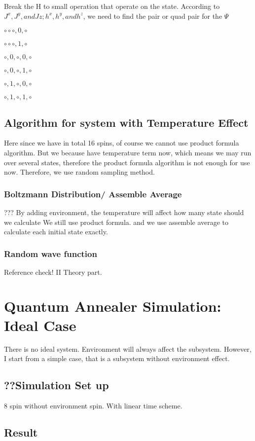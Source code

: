 \documentclass[twoside,a4paper,article]{combine}
\begin{document}
Break the H to small operation that operate on the state. According to $J^x , J^y, and Jz; h^x, h^y, and h^z$, we need to find the pair or quad pair for the $\Psi$

$\circ \circ \circ ,0, \circ$

$\circ \circ \circ ,1, \circ$

$\circ ,0, \circ ,0, \circ$

$\circ ,0, \circ ,1, \circ$

$\circ ,1, \circ ,0, \circ$

$\circ ,1, \circ ,1, \circ$

\subsection{Algorithm for system with Temperature Effect}
Here since we have in total 16 spins, of course we cannot use product formula algorithm. But we because have temperature term now, which means we may run over several states, therefore the product formula algorithm is not enough for use now. Therefore, we use random sampling method.
\subsubsection{Boltzmann Distribution/ Assemble Average}
???	By adding environment, the temperature will affect how many state should we calculate
We still use product formula. and we use assemble average to calculate each initial state exactly.
\subsubsection{Random wave function}
Reference check! II Theory part.
\cite{Hams2000} 





\section{Quantum Annealer Simulation: Ideal Case}
	There is no ideal system. Environment will always affect the subsystem. However, I start from a simple case, that is a subsystem without environment effect. 
\subsection{??Simulation Set up}
	8 spin without environment spin. With linear time scheme. 

\subsection{Result}
\end{document}

